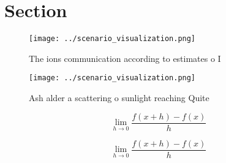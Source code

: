 \documentclass[a4paper]{article}
\begin{document}
\section{Section}

\begin{figure}
\centering
\texttt{[image: ../scenario\_visualization.png]}
\caption{The ions communication according to estimates o I
}
\end{figure}
 
\begin{figure}
\centering
\texttt{[image: ../scenario\_visualization.png]}
\caption{Ash alder a scattering o sunlight reaching Quite 
}
\end{figure}
 
\[\lim_{h \rightarrow 0 } \frac{f(x+h)-f(x)}{h}\]

\[\lim_{h \rightarrow 0 } \frac{f(x+h)-f(x)}{h}\]
\end{document}
